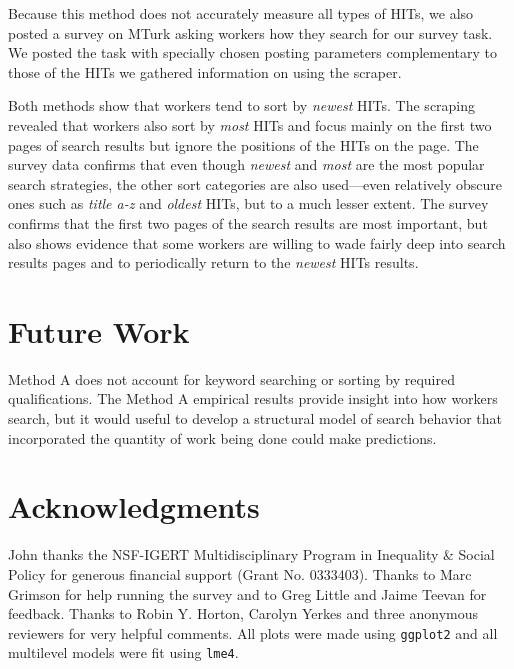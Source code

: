 \documentclass{sig-alternate}
\begin{document}
Because this method does not accurately measure all types of HITs, we
also posted a survey on MTurk asking workers how they search
for our survey task.  We posted the task with specially chosen posting
parameters complementary to those of the HITs we gathered
information on using the scraper.

Both methods show that workers tend to sort by {\em newest} HITs.  The
scraping revealed that workers also sort by {\em most} HITs and focus
mainly on the first two pages of search results but ignore the
positions of the HITs on the page.  The survey data confirms that even
though {\em newest} and {\em most} are the most popular search
strategies, the other sort categories are also used---even relatively
obscure ones such as {\em title a-z} and {\em oldest} HITs, but to a
much lesser extent. The survey confirms that the first two pages of
the search results are most important, but also shows evidence that
some workers are willing to wade fairly deep into search results pages
and to periodically return to the {\em newest} HITs results.

\section{Future Work}
Method A does not account for keyword searching or sorting by required
qualifications. The Method A empirical results provide insight into
how workers search, but it would useful to develop a structural model
of search behavior that incorporated the quantity of work being done
could make predictions.

\section{Acknowledgments} 
John thanks the NSF-IGERT Multidisciplinary Program in Inequality \&
Social Policy for generous financial support (Grant
No. 0333403). Thanks to Marc Grimson for help running the
survey and to Greg Little and Jaime Teevan for feedback. Thanks to Robin Y. Horton, Carolyn Yerkes and three anonymous
reviewers for very helpful comments. All plots were made using
\texttt{ggplot2} \cite{wickham2008ggplot2} and all multilevel models
were fit using \texttt{lme4}\cite{bates2008lme4}.



\end{document}

